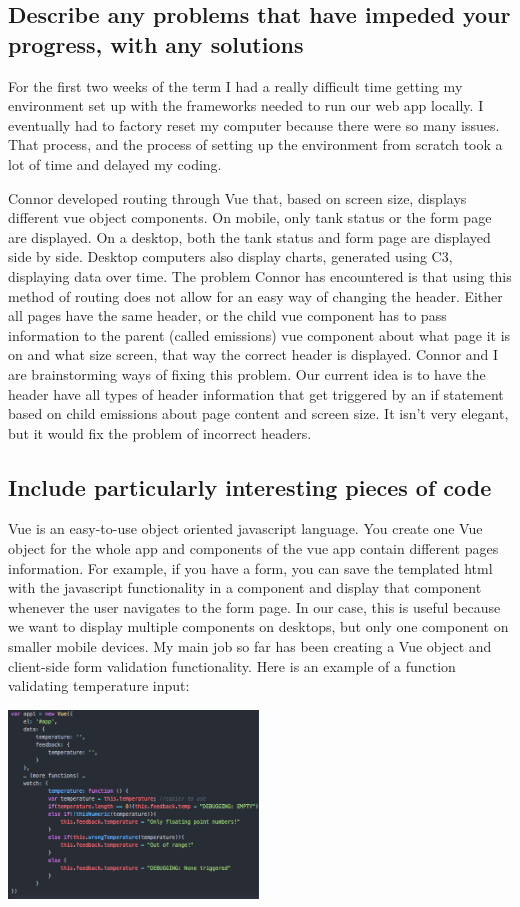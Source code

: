 \documentclass[draftclsnofoot,onecolumn,letterpaper,10pt,compsoc]{IEEEtran}
\begin{document}
\subsection{Describe any problems that have impeded your progress, with any solutions}
For the first two weeks of the term I had a really difficult time getting my environment set up with the frameworks needed to run our web app locally. I eventually had to factory reset my computer because there were so many issues. That process, and the process of setting up the environment from scratch took a lot of time and delayed my coding.

Connor developed routing through Vue that, based on screen size, displays different vue object components. On mobile, only tank status or the form page are displayed. On a desktop, both the tank status and form page are displayed side by side. Desktop computers also display charts, generated using C3, displaying data over time. The problem Connor has encountered is that using this method of routing does not allow for an easy way of changing the header. Either all pages have the same header, or the child vue component has to pass information to the parent (called emissions) vue component about what page it is on and what size screen, that way the correct header is displayed. Connor and I are brainstorming ways of fixing this problem. Our current idea is to have the header have all types of header information that get triggered by an if statement based on child emissions about page content and screen size. It isn’t very elegant, but it would fix the problem of incorrect headers.

\subsection{Include particularly interesting pieces of code}
Vue is an easy-to-use object oriented javascript language. You create one Vue object for the whole app and components of the vue app contain different pages information. For example, if you have a form, you can save the templated html with the javascript functionality in a component and display that component whenever the user navigates to the form page. In our case, this is useful because we want to display multiple components on desktops, but only one component on smaller mobile devices.
My main job so far has been creating a Vue object and client-side form validation functionality. Here is an example of a function validating temperature input:


\centerline{\includegraphics[height=5cm]{screenshots/vuecode.png}}
\end{document}

